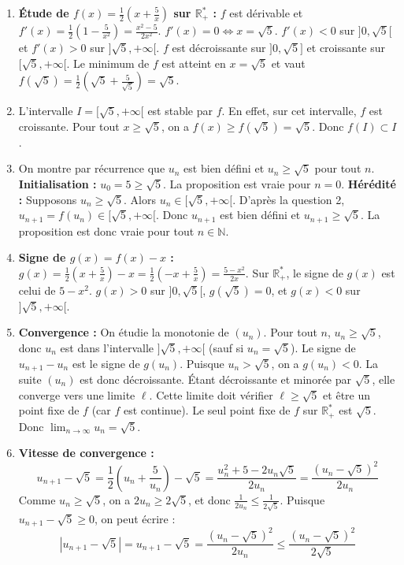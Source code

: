 \documentclass[solutions]{exercices}
\begin{document}
\begin{solution}
\begin{enumerate}
    \item \textbf{Étude de $f(x) = \frac{1}{2}(x+\frac{5}{x})$ sur $\mathbb{R}_+^*$ :}
    $f$ est dérivable et $f'(x) = \frac{1}{2}(1-\frac{5}{x^2}) = \frac{x^2-5}{2x^2}$.
    $f'(x)=0 \iff x=\sqrt{5}$.
    $f'(x)<0$ sur $]0, \sqrt{5}[$ et $f'(x)>0$ sur $]\sqrt{5}, +\infty[$.
    $f$ est décroissante sur $]0, \sqrt{5}]$ et croissante sur $[\sqrt{5}, +\infty[$.
    Le minimum de $f$ est atteint en $x=\sqrt{5}$ et vaut $f(\sqrt{5}) = \frac{1}{2}(\sqrt{5}+\frac{5}{\sqrt{5}}) = \sqrt{5}$.
    \item L'intervalle $I=[\sqrt{5}, +\infty[$ est stable par $f$. En effet, sur cet intervalle, $f$ est croissante. Pour tout $x \ge \sqrt{5}$, on a $f(x) \ge f(\sqrt{5}) = \sqrt{5}$. Donc $f(I) \subset I$.
    \item On montre par récurrence que $u_n$ est bien défini et $u_n \ge \sqrt{5}$ pour tout $n$.
    \textbf{Initialisation :} $u_0=5 \ge \sqrt{5}$. La proposition est vraie pour $n=0$.
    \textbf{Hérédité :} Supposons $u_n \ge \sqrt{5}$. Alors $u_n \in [\sqrt{5}, +\infty[$.
    D'après la question 2, $u_{n+1} = f(u_n) \in [\sqrt{5}, +\infty[$. Donc $u_{n+1}$ est bien défini et $u_{n+1} \ge \sqrt{5}$.
    La proposition est donc vraie pour tout $n \in \mathbb{N}$.
    \item \textbf{Signe de $g(x)=f(x)-x$ :}
    $g(x) = \frac{1}{2}(x+\frac{5}{x}) - x = \frac{1}{2}(-x+\frac{5}{x}) = \frac{5-x^2}{2x}$.
    Sur $\mathbb{R}_+^*$, le signe de $g(x)$ est celui de $5-x^2$.
    $g(x) > 0$ sur $]0, \sqrt{5}[$, $g(\sqrt{5})=0$, et $g(x) < 0$ sur $]\sqrt{5}, +\infty[$.
    \item \textbf{Convergence :} On étudie la monotonie de $(u_n)$. Pour tout $n$, $u_n \ge \sqrt{5}$, donc $u_n$ est dans l'intervalle $]\sqrt{5}, +\infty[$ (sauf si $u_n=\sqrt{5}$).
    Le signe de $u_{n+1}-u_n$ est le signe de $g(u_n)$. Puisque $u_n > \sqrt{5}$, on a $g(u_n) < 0$.
    La suite $(u_n)$ est donc décroissante.
    Étant décroissante et minorée par $\sqrt{5}$, elle converge vers une limite $\ell$.
    Cette limite doit vérifier $\ell \ge \sqrt{5}$ et être un point fixe de $f$ (car $f$ est continue).
    Le seul point fixe de $f$ sur $\mathbb{R}_+^*$ est $\sqrt{5}$. Donc $\lim_{n\to\infty} u_n = \sqrt{5}$.
    \item \textbf{Vitesse de convergence :}
    \[ u_{n+1}-\sqrt{5} = \frac{1}{2}\left(u_n+\frac{5}{u_n}\right) - \sqrt{5} = \frac{u_n^2+5-2u_n\sqrt{5}}{2u_n} = \frac{(u_n-\sqrt{5})^2}{2u_n} \]
    Comme $u_n \ge \sqrt{5}$, on a $2u_n \ge 2\sqrt{5}$, et donc $\frac{1}{2u_n} \le \frac{1}{2\sqrt{5}}$.
    Puisque $u_{n+1}-\sqrt{5} \ge 0$, on peut écrire :
    \[ |u_{n+1}-\sqrt{5}| = u_{n+1}-\sqrt{5} = \frac{(u_n-\sqrt{5})^2}{2u_n} \le \frac{(u_n-\sqrt{5})^2}{2\sqrt{5}} \]
\end{enumerate}
\end{solution}
\end{document}
